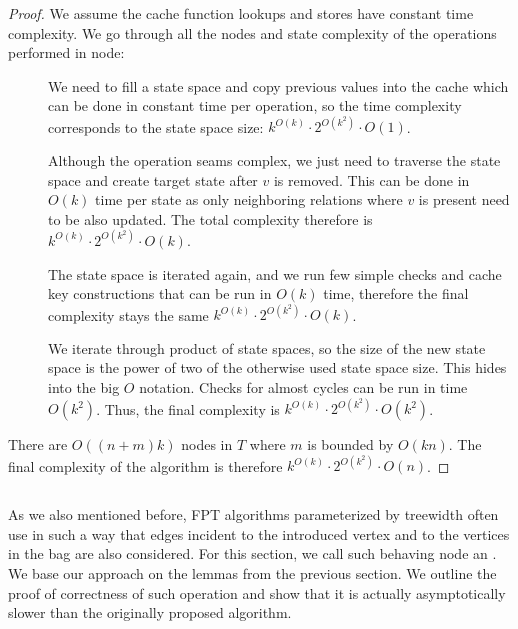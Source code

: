 \begin{proof}
	We assume the cache function lookups and stores have constant time complexity.
	We go through all the nodes and state complexity of the operations performed in node:
	\begin{description}
		\item[\IntroduceVertexNode{}]
		      We need to fill a state space and copy previous values into the cache
		      which can be done in constant time per operation,
		      so the time complexity corresponds to the state space size:
		      \( {k}^{O(k)} \cdot 2^{O(k^2)} \cdot O(1) \).
		\item[\ForgetVertexNode{}]
		      Although the operation seams complex, we just need to traverse the state space
		      and create target state after \( v \) is removed.
		      This can be done in \( O(k) \) time
		      per state as only neighboring relations where \( v \) is present
		      need to be also updated.
		      The total complexity therefore is
		      \( {k}^{O(k)} \cdot 2^{O(k^2)} \cdot O(k) \).
		\item[\IntroduceEdgeNode{}]
		      The state space is iterated again, and we run few simple checks and cache key constructions
		      that can be run in \( O(k) \) time, therefore the final complexity stays the same
		      \( {k}^{O(k)} \cdot 2^{O(k^2)} \cdot O(k) \).
		\item[\JoinNode{}]
		      We iterate through product of state spaces,
		      so the size of the new state space is the power of two
		      of the otherwise used state space size.
		      This hides into the big \( O \) notation.
		      Checks for almost cycles can be run in time \( O(k^2) \).
		      Thus, the final complexity is
		      \( {k}^{O(k)} \cdot 2^{O(k^2)} \cdot O(k^2) \).
	\end{description}
	There are \( O((n+m)k) \) nodes in \( T \) where \( m \) is bounded by \( O(kn) \).
	The final complexity of the algorithm is therefore
	\( {k}^{O(k)} \cdot 2^{O(k^2)} \cdot O(n) \).
\end{proof}
%

\subsection{\IntroduceVertexWithEdgesNode{}}

As we also mentioned before, FPT algorithms parameterized by treewidth
often use \IntroduceVertexNode{} in such a way
that edges incident to the introduced vertex and to
the vertices in the bag are also considered.
For this section, we call such behaving node an \IntroduceVertexWithEdgesNode{}.
%
We base our approach on the lemmas from the previous section.
We outline the proof of correctness of such operation and show
that it is actually asymptotically slower than the originally proposed algorithm.

